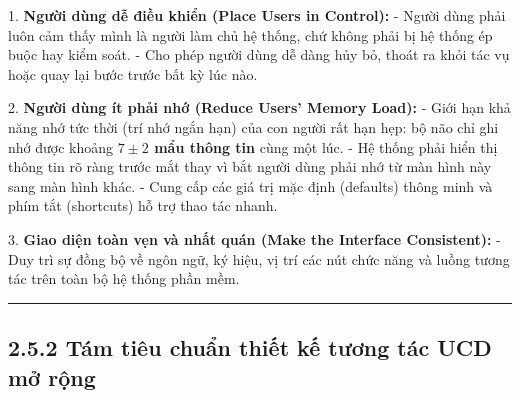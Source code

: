 \documentclass[11pt,a4paper,oneside]{report}
\begin{document}
\begin{myquote}
1. \textbf{Người dùng dễ điều khiển (Place Users in Control):}
- Người dùng phải luôn cảm thấy mình là người làm chủ hệ thống, chứ không phải bị hệ thống ép buộc hay kiểm soát.
- Cho phép người dùng dễ dàng hủy bỏ, thoát ra khỏi tác vụ hoặc quay lại bước trước bất kỳ lúc nào.

2. \textbf{Người dùng ít phải nhớ (Reduce Users' Memory Load):}
- Giới hạn khả năng nhớ tức thời (trí nhớ ngắn hạn) của con người rất hạn hẹp: bộ não chỉ ghi nhớ được khoảng \textbf{$7 \pm 2$ mẩu thông tin} cùng một lúc.
- Hệ thống phải hiển thị thông tin rõ ràng trước mắt thay vì bắt người dùng phải nhớ từ màn hình này sang màn hình khác.
- Cung cấp các giá trị mặc định (defaults) thông minh và phím tắt (shortcuts) hỗ trợ thao tác nhanh.

3. \textbf{Giao diện toàn vẹn và nhất quán (Make the Interface Consistent):}
- Duy trì sự đồng bộ về ngôn ngữ, ký hiệu, vị trí các nút chức năng và luồng tương tác trên toàn bộ hệ thống phần mềm.
\end{myquote}

\bigskip\hrule\bigskip

\subsection{2.5.2 Tám tiêu chuẩn thiết kế tương tác UCD mở rộng}
\end{document}

